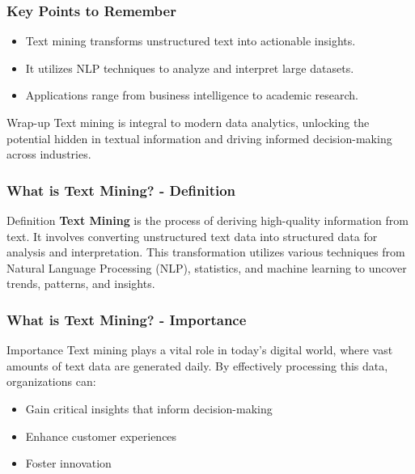 \documentclass[aspectratio=169]{beamer}
\begin{document}
\begin{frame}[fragile]
    \frametitle{Key Points to Remember}
    \begin{itemize}
        \item Text mining transforms unstructured text into actionable insights.
        \item It utilizes NLP techniques to analyze and interpret large datasets.
        \item Applications range from business intelligence to academic research.
    \end{itemize}
    
    \begin{block}{Wrap-up}
        Text mining is integral to modern data analytics, unlocking the potential hidden in textual information and driving informed decision-making across industries.
    \end{block}
\end{frame}

\begin{frame}[fragile]
    \frametitle{What is Text Mining? - Definition}
    \begin{block}{Definition}
        \textbf{Text Mining} is the process of deriving high-quality information from text. It involves converting unstructured text data into structured data for analysis and interpretation. This transformation utilizes various techniques from Natural Language Processing (NLP), statistics, and machine learning to uncover trends, patterns, and insights.
    \end{block}
\end{frame}

\begin{frame}[fragile]
    \frametitle{What is Text Mining? - Importance}
    \begin{block}{Importance}
        Text mining plays a vital role in today’s digital world, where vast amounts of text data are generated daily. By effectively processing this data, organizations can:
        \begin{itemize}
            \item Gain critical insights that inform decision-making
            \item Enhance customer experiences
            \item Foster innovation
        \end{itemize}
    \end{block}
\end{frame}
\end{document}
